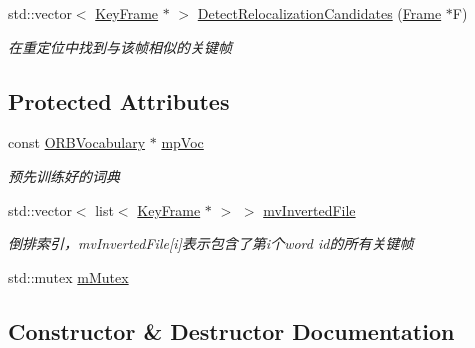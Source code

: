\begin{DoxyCompactItemize}
std\+::vector$<$ \mbox{\hyperlink{class_o_r_b___s_l_a_m2_1_1_key_frame}{Key\+Frame}} $\ast$ $>$ \mbox{\hyperlink{class_o_r_b___s_l_a_m2_1_1_key_frame_database_a008586e4d07ece0d948d0f1633447a2b}{Detect\+Relocalization\+Candidates}} (\mbox{\hyperlink{class_o_r_b___s_l_a_m2_1_1_frame}{Frame}} $\ast$F)
\begin{DoxyCompactList}\small\item\em 在重定位中找到与该帧相似的关键帧 \end{DoxyCompactList}\end{DoxyCompactItemize}
\subsection*{Protected Attributes}
\begin{DoxyCompactItemize}
\item 
const \mbox{\hyperlink{namespace_o_r_b___s_l_a_m2_a2fafba714858cab1bb18d438e2e83c5d}{O\+R\+B\+Vocabulary}} $\ast$ \mbox{\hyperlink{class_o_r_b___s_l_a_m2_1_1_key_frame_database_ad11a653313a5f0ef6f6fbc4880df0b7d}{mp\+Voc}}
\begin{DoxyCompactList}\small\item\em 预先训练好的词典 \end{DoxyCompactList}\item 
std\+::vector$<$ list$<$ \mbox{\hyperlink{class_o_r_b___s_l_a_m2_1_1_key_frame}{Key\+Frame}} $\ast$ $>$ $>$ \mbox{\hyperlink{class_o_r_b___s_l_a_m2_1_1_key_frame_database_a3b6d73823fcd1b96f3ba5a66be0b2227}{mv\+Inverted\+File}}
\begin{DoxyCompactList}\small\item\em 倒排索引，mv\+Inverted\+File\mbox{[}i\mbox{]}表示包含了第i个word id的所有关键帧 \end{DoxyCompactList}\item 
std\+::mutex \mbox{\hyperlink{class_o_r_b___s_l_a_m2_1_1_key_frame_database_a31fc30f1474b8c97d81c96135e6912a1}{m\+Mutex}}
\end{DoxyCompactItemize}


\subsection{Constructor \& Destructor Documentation}
\mbox{\label{class_o_r_b___s_l_a_m2_1_1_key_frame_database_a83495a11d1fb3cd98e82fa1e2efb6920}} 

